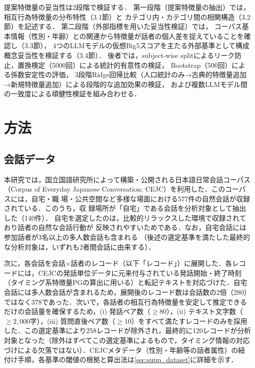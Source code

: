 \documentclass[dvipdfmx,11pt,a4paper]{bxjsarticle}
\renewcommand{\_}{\paperorigunderscore\allowbreak}%
\begin{document}
提案特徴量の妥当性は2段階で検証する．
第一段階（提案特徴量の抽出）では，相互行為特徴量の分布特性（3.1節）と
カテゴリ内・カテゴリ間の相関構造（3.2節）を記述する．
第二段階（外部指標を用いた妥当性検証）では，
コーパス基本情報（性別・年齢）との関連から特徴量が話者の個人差を捉えていることを確認し（3.3節），
4つのLLMモデルの仮想Big5スコアを主たる外部基準として構成概念妥当性を検証する（3.4節）．
後者では，subject-wise splitによるリーク防止，置換検定（5000回）による統計的有意性の検証，
Bootstrap（500回）による係数安定性の評価，
3段階Ridge回帰比較（人口統計のみ→古典的特徴量追加→新規特徴量追加）による段階的な追加効果の検証，
および複数LLMモデル間の一致度による頑健性検証を組み合わせる．

\section{方法}

\subsection{会話データ}
\label{sec:data}

本研究では，国立国語研究所によって構築・公開される日本語日常会話コーパス（Corpus
of Everyday Japanese Conversation; CEJC）を利用した．このコーパスには，自宅・職
場・公共空間など多様な場面における577件の自然会話が収録されている．このうち，収
録場所が「自宅」である会話を分析対象として抽出した（140件）．
自宅を選定したのは，比較的リラックスした環境で収録されており話者の自然な会話行動が
反映されやすいためである．なお，自宅会話には参加話者が3名以上の多人数会話も含まれる
（後述の選定基準を満たした最終的な分析対象は，いずれも2者間会話に由来する）．


次に，各会話を会話$\times$話者のレコード（以下「レコード」）に展開した．各レコードには，CEJCの発話単位データに元来付与されている発話開始・終了時刻（タイミング系特徴量PGの算出に用いる）と転記テキストを対応づけた．自宅会話には多人数会話が含まれるため，展開後のレコード数は会話数の2倍（280）ではなく378であった．次いで，各話者の相互行為特徴量を安定して推定できるだけの会話量を確保するため，(i) 発話ペア数（$\geq 80$），(ii) テキスト文字数（$\geq 2{,}000$字），(iii) 質問直後ペア数（$\geq 10$）をすべて満たすレコードのみを採用した．この選定基準により258レコードが除外され，最終的に120レコードが分析対象となった（除外はすべてこの選定基準によるもので，タイミング情報の対応づけによる欠落ではない）．CEJCメタデータ（性別・年齢等の話者属性）の紐付け手順，各基準の閾値の根拠と算出法は\ref{sec:supp_dataset}に詳細を示す．
\end{document}
